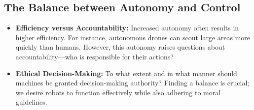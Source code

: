 \subsection{The Balance between Autonomy and Control}
\begin{itemize}
    \item \textbf{Efficiency versus Accountability:} Increased autonomy often results in higher efficiency. For instance, autonomous drones can scout large areas more quickly than humans. However, this autonomy raises questions about accountability—who is responsible for their actions?
    
    \item \textbf{Ethical Decision-Making:} To what extent and in what manner should machines be granted decision-making authority? Finding a balance is crucial; we desire robots to function effectively while also adhering to moral guidelines.\cite{unknown-author-2024}
\end{itemize}
